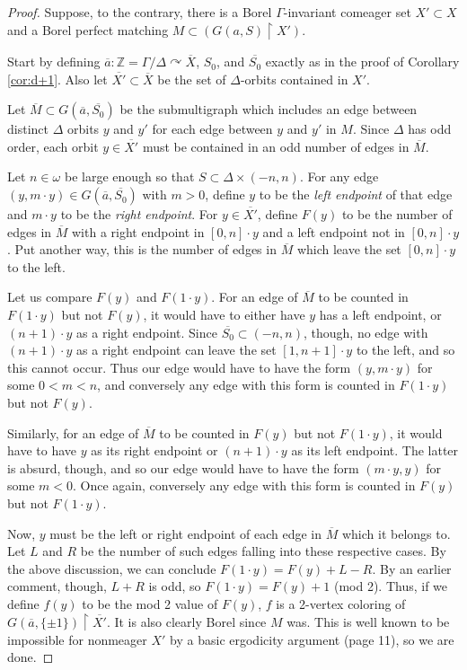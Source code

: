 \documentclass[10pt,a4paper]{article}
\newcommand{\0}{\varnothing}
\newcommand{\Z}{\mathbb{Z}}
\newcommand{\res}{\upharpoonright}
\begin{document}
\begin{proof}
Suppose, to the contrary, there is a Borel $\Gamma$-invariant comeager set $X' \subset X$ and a Borel perfect matching $M \subset (G(a,S) \res X'
)$. 

Start by defining $\overline{a}:\Z = \Gamma/\Delta \curvearrowright \overline{X}$, $S_0$, and $\overline{S_0}$ exactly as in the proof of Corollary \ref{cor:d+1}. Also let $\overline{X'} \subset \overline{X}$ be the set of $\Delta$-orbits contained in $X'$.

Let $\overline{M} \subset G(\overline{a},\overline{S_0})$ be the submultigraph which includes an edge between distinct $\Delta$ orbits $y$ and $y'$ for each edge between $y$ and $y'$ in $M$. Since $\Delta$ has odd order, each orbit $y \in \overline{X'}$ must be contained in an odd number of edges in $\overline{M}$.

Let $n \in \omega$ be large enough so that $S \subset \Delta \times (-n,n)$. For any edge $(y,m \cdot y) \in G(\overline{a},\overline{S_0})$ with $m > 0$, define $y$ to be the \textit{left endpoint} of that edge and $m \cdot y$ to be the \textit{right endpoint}. For $y \in \overline{X'}$, define $F(y)$ to be the number of edges in $\overline{M}$ with a right endpoint in $[0,n] \cdot y$ and a left endpoint not in $[0,n] \cdot y$. Put another way, this is the number of edges in $\overline{M}$ which leave the set $[0,n] \cdot y$ to the left.

Let us compare $F(y)$ and $F(1 \cdot y)$. For an edge of $\overline{M}$ to be counted in $F(1 \cdot y)$ but not $F(y)$, it would have to either have $y$ has a left endpoint, or $(n+1) \cdot y$ as a right endpoint. Since $\overline{S_0} \subset (-n,n)$, though, no edge with $(n+1) \cdot y$ as a right endpoint can leave the set $[1,n+1] \cdot y$ to the left, and so this cannot occur. Thus our edge would have to have the form $(y,m \cdot y)$ for some $0 < m < n$, and conversely any edge with this form is counted in $F(1 \cdot y)$ but not $F(y)$. 

Similarly, for an edge of $\overline{M}$ to be counted in $F(y)$ but not $F(1 \cdot y)$, it would have to have $y$ as its right endpoint or $(n+1) \cdot y$ as its left endpoint.  The latter is absurd, though, and so our edge would have to have the form $(m \cdot y, y)$ for some $m < 0$. Once again, conversely any edge with this form is counted in $F(y)$ but not $F(1 \cdot y)$.

Now, $y$ must be the left or right endpoint of each edge in $\overline{M}$ which it belongs to. Let $L$ and $R$ be the number of such edges falling into these respective cases. By the above discussion, we can conclude $F(1 \cdot y) = F(y)  + L - R$. By an earlier comment, though, $L+R$ is odd, so $F(1 \cdot y) = F(y) + 1$ (mod 2). Thus, if we define $f(y)$ to be the mod 2 value of $F(y)$, $f$ is a 2-vertex coloring of $G(\overline{a},\{\pm 1\}) \res \overline{X'}$. It is also clearly Borel since $M$ was. This is well known to be impossible for nonmeager $X'$ by a basic ergodicity argument \cite{KST} (page 11), so we are done. 


\end{proof}
\end{document}
